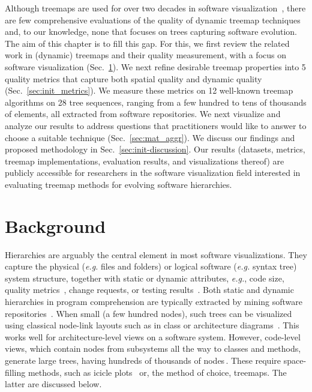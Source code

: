 Although treemaps are used for over two decades in software visualization~\citep{shneiderman92,schulz11_treesurvey,treevis,landesberger11}, there are few comprehensive evaluations of the quality of dynamic treemap techniques and, to our knowledge, none that focuses on trees capturing software evolution. The aim of this chapter is to fill this gap. For this, we first review the related work in (dynamic) treemaps and their quality measurement, with a focus on software visualization (Sec.~\ref{sec:init-background}). We next refine desirable treemap properties into 5 quality metrics that capture both spatial quality and dynamic quality (Sec.~\ref{sec:init_metrics}). We measure these metrics on 12 well-known treemap algorithms on 28 tree sequences, ranging from a few hundred to tens of thousands of elements, all extracted from software repositories. We next visualize and analyze our results to address questions that practitioners would like to answer to choose a suitable technique (Sec.~\ref{sec:mat_aggr}). We discuss our findings and proposed methodology in Sec.~\ref{sec:init-discussion}. Our results (datasets, metrics, treemap implementations, evaluation results, and visualizations thereof) are publicly accessible for researchers in the software visualization field interested in evaluating treemap methods for evolving software hierarchies.

\section{Background}
\label{sec:init-background}
%
%
Hierarchies are arguably the central element in most software visualizations. They capture the physical (\emph{e.g.} files and folders) or logical software (\emph{e.g.} syntax tree) system structure, together with static or dynamic attributes, \emph{e.g.}, code size, quality metrics~\citep{lanza06}, change requests, or testing results~\citep{diehl08}. Both static and dynamic hierarchies in program comprehension are typically extracted by mining software repositories~\citep{lanza03,kagdi07}.
When small (a few hundred nodes), such trees can be visualized using classical node-link layouts such as in class or architecture diagrams~\citep{muller88,lanza03,telea02}. This works well for architecture-level views on a software system. However, code-level views, which contain nodes from subsystems all the way to classes and methods, generate large trees, having hundreds of thousands of nodes\,\citep{sunburst2}. These require space-filling methods, such as icicle plots~\citep{holten06,cornelissen07} or, the method of choice, treemaps. The latter are discussed below.

